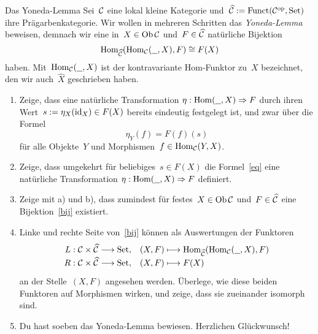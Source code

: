 \documentclass{pizzablatt}
\begin{document}

\begin{aufgabe}{Das Yoneda-Lemma}
Sei~$\mathcal{C}$ eine lokal kleine Kategorie und~$\widehat {\mathcal{C}} := \mathrm{Funct}(\mathcal{C}^{\mathrm{op}},\mathrm{Set})$
ihre Prägarbenkategorie. Wir wollen in mehreren Schritten das \emph{Yoneda-Lemma}
beweisen, demnach wir eine in~$X \in \operatorname{Ob} \mathcal{C}$ und~$F \in \widehat {\mathcal{C}}$
natürliche Bijektion
\begin{equation}\label{bij}\mathrm{Hom}_{\widehat{\mathcal{C}}}(\mathrm{Hom}_{\mathcal{C}}(\underline{\ \ }, X), F) \cong F(X)
\end{equation}
haben. Mit~$\mathrm{Hom}_{\mathcal{C}}(\underline{\ \ },X)$ ist der kontravariante Hom-Funktor zu~$X$
bezeichnet, den wir auch~$\widehat X$ geschrieben haben.
\begin{enumerate}
\item Zeige, dass eine natürliche Transformation $\eta : \mathrm{Hom}(\underline{\ \ }, X)
\Rightarrow F$ durch ihren Wert~$s := \eta_X(\mathrm{id}_X) \in F(X)$ bereits eindeutig
festgelegt ist, und zwar über die Formel
\begin{equation}\label{eq} \eta_Y(f) = F(f)(s) \end{equation}
für alle Objekte~$Y$ und Morphismen~$f \in \mathrm{Hom}_{\mathcal{C}}(Y,X)$.
\item Zeige, dass umgekehrt für beliebiges~$s \in F(X)$ die Formel~\eqref{eq} eine
natürliche Transformation $\eta : \mathrm{Hom}(\underline{\ \ }, X) \Rightarrow F$ definiert.
\item Zeige mit a) und b), dass zumindest für festes~$X \in \operatorname{Ob}\mathcal{C}$ und~$F \in
\widehat{\mathcal{C}}$ eine Bijektion~\eqref{bij} existiert.
\item Linke und rechte Seite von~\eqref{bij} können als Auswertungen der
Funktoren
\[ \renewcommand{\arraystretch}{1.3}\begin{array}{@{}rl@{}}
  L : \C \times \widehat\C \longrightarrow \Set, &
  (X,F) \longmapsto \Hom_{\widehat\C}(\Hom_\C(\freist,X), F)
  \\
  R : \C \times \widehat\C \longrightarrow \Set, &
  (X,F) \longmapsto F(X)
\end{array} \]
an der Stelle~$(X,F)$ angesehen werden. Überlege, wie diese beiden Funktoren auf
Morphismen wirken, und zeige, dass sie zueinander isomorph sind.
\item Du hast soeben das Yoneda-Lemma bewiesen. Herzlichen Glückwunsch!
\end{enumerate}
\end{aufgabe}
\end{document}
